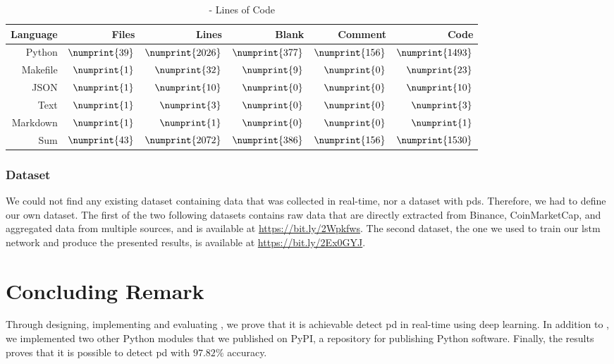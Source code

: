 \begin{table}[ht]
        \centering
        \begin{tabularx}{\textwidth}{ |R|R|R|R|R|R| }\hline
        Language    & Files             & Lines             & Blank             & Comment           & Code              \\\hline
        Python      & $\numprint{39}$   & $\numprint{2026}$ & $\numprint{377}$  & $\numprint{156}$  & $\numprint{1493}$ \\
        Makefile    & $\numprint{1}$    & $\numprint{32}$   & $\numprint{9}$    & $\numprint{0}$    & $\numprint{23}$   \\
        JSON        & $\numprint{1}$    & $\numprint{10}$   & $\numprint{0}$    & $\numprint{0}$    & $\numprint{10}$   \\
        Text        & $\numprint{1}$    & $\numprint{3}$    & $\numprint{0}$    & $\numprint{0}$    & $\numprint{3}$    \\
        Markdown    & $\numprint{1}$    & $\numprint{1}$    & $\numprint{0}$    & $\numprint{0}$    & $\numprint{1}$    \\\hline
        Sum         & $\numprint{43}$   & $\numprint{2072}$ & $\numprint{386}$  & $\numprint{156}$  & $\numprint{1530}$ \\\hline
        \end{tabularx}
        \caption{\project - Lines of Code}
        \label{tab:cloc_thesis}
\end{table}

\subsubsection{Dataset}
We could not find any existing dataset containing data that was collected in real-time, nor a dataset with \acp{pd}. Therefore, we had to define our own dataset. The first of the two following datasets contains raw data that are directly extracted from Binance, CoinMarketCap, and aggregated data from multiple sources, and is available at \url{https://bit.ly/2Wpkfws}. The second dataset, the one we used to train our \ac{lstm} network and produce the presented results, is available at \url{https://bit.ly/2Ex0GYJ}.

\section{Concluding Remark}
Through designing, implementing and evaluating \project, we prove that it is achievable detect \ac{pd} in real-time using deep learning. In addition to \project, we implemented two other Python modules that we published on PyPI, a repository for publishing Python software. Finally, the results proves that it is possible to detect \ac{pd} with $97.82\%$ accuracy.

